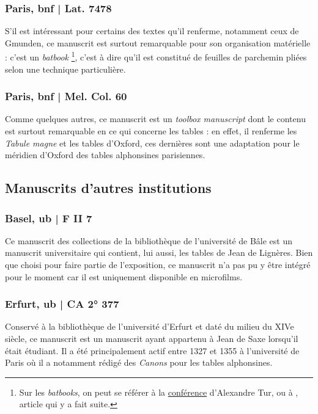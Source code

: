     \subsubsection{Paris, \acrshort{bnf} | Lat. 7478}
    S’il est intéressant pour certains des textes qu’il renferme, notamment ceux de Gmunden, ce manuscrit est surtout remarquable pour son organisation matérielle : c’est un \textit{batbook} \footnote{Sur les \textit{batbooks}, on peut se référer à la \href{https://www.youtube.com/watch?v=98xxOIIwcDw}{conférence} d’Alexandre Tur, ou à \cite{turConservateurDocumentBat2021}, article qui y a fait suite.}, c'est à dire qu'il est constitué de feuilles de parchemin pliées selon une technique particulière. 

    \subsubsection{Paris, \acrshort{bnf} | Mel. Col. 60}
    Comme quelques autres, ce manuscrit est un \textit{toolbox manuscript} dont le contenu est surtout remarquable en ce qui concerne les tables : en effet, il renferme les \textit{Tabule magne} et les tables d’Oxford, ces dernières sont une adaptation pour le méridien d’Oxford des tables alphonsines parisiennes. 

	
	\subsection{Manuscrits d'autres institutions}
	
	\subsubsection{Basel, \acrshort{ub} | F II 7}
    Ce manuscrit des collections de la bibliothèque de l'université de Bâle est un manuscrit universitaire qui contient, lui aussi, les tables de Jean de Lignères. Bien que choisi pour faire partie de l'exposition, ce manuscrit n'a pas pu y être intégré pour le moment car il est uniquement disponible en microfilms.

    \subsubsection{Erfurt, \acrshort{ub} | CA 2° 377}
    Conservé à la bibliothèque de l’université d’Erfurt et daté du milieu du XIVe siècle, ce manuscrit est un manuscrit ayant appartenu à Jean de Saxe lorsqu’il était étudiant. Il a été principalement actif entre 1327 et 1355 à l’université de Paris où il a notamment rédigé des \textit{Canons} pour les tables alphonsines. 

